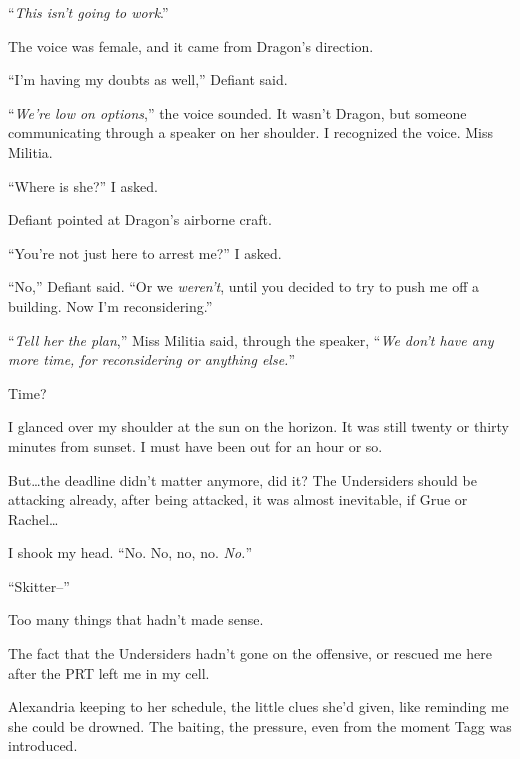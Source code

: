 ``\emph{This isn't going to work}.''



The voice was female, and it came from Dragon's direction.



``I'm having my doubts as well,'' Defiant said.



``\emph{We're low on options},'' the voice sounded.  It wasn't Dragon, but someone communicating through a speaker on her shoulder.  I recognized the voice.  Miss Militia.



``Where is she?'' I asked.



Defiant pointed at Dragon's airborne craft.



``You're not just here to arrest me?'' I asked.



``No,'' Defiant said.  ``Or we \emph{weren't}, until you decided to try to push me off a building.  Now I'm reconsidering.''



``\emph{Tell her the plan},'' Miss Militia said, through the speaker,  ``\emph{We don't have any more time, for reconsidering or anything else.}''



Time?



I glanced over my shoulder at the sun on the horizon.  It was still twenty or thirty minutes from sunset.  I must have been out for an hour or so.



But\ldots the deadline didn't matter anymore, did it?  The Undersiders should be attacking already, after being attacked, it was almost inevitable, if Grue or Rachel\ldots



I shook my head.  ``No.  No, no, no.  \emph{No.}''



``Skitter--''



Too many things that hadn't made sense.



The fact that the Undersiders hadn't gone on the offensive, or rescued me here after the PRT left me in my cell.



Alexandria keeping to her schedule, the little clues she'd given, like reminding me she could be drowned.  The baiting, the pressure, even from the moment Tagg was introduced.



